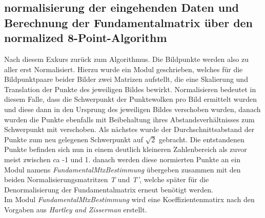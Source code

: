 \subsection{normalisierung der eingehenden Daten und Berechnung der Fundamentalmatrix über den normalized 8-Point-Algorithm}


Nach diesem Exkurs zurück zum Algorithmus. Die Bildpunkte werden also zu aller erst Normalisiert. Hierzu wurde ein Modul geschrieben, welches für die Bildpunktpaare beider Bilder zwei Matrizen aufstellt, die eine Skalierung und Translation der Punkte des jeweiligen Bildes bewirkt. Normalisieren bedeutet in diesem Falle, dass die Schwerpunkt der Punktewolken pro Bild ermittelt wurden und diese dann in den Ursprung des jeweiligen Bildes verschoben wurden, danach wurden die Punkte ebenfalls mit Beibehaltung ihres Abstandsverhältnisses zum Schwerpunkt mit verschoben. Als nächstes wurde der Durchschnittsabstand der Punkte zum neu gelegenen Schwerpunkt auf \ensuremath{\sqrt{2}} gebracht. Die entstandenen Punkte befinden sich nun in einem deutlich kleineren Zahlenbereich als zuvor meist zwischen ca -1 und 1. danach werden diese normierten Punkte an ein Modul namens \textit{FundamentalMtxBestimmung} übergeben zusammen mit den beiden Normalisierungsmatritzen \textit{T} und \textit{T'}, welche später für die Denormalisierung der Fundamentalmatrix erneut benötigt werden.\\

Im Modul \textit{FundamentalMtxBestimmung} wird eine Koeffizientenmatirx nach den Vorgaben aus \textit{Hartley and Zisserman} erstellt\cite{HZ}. 

